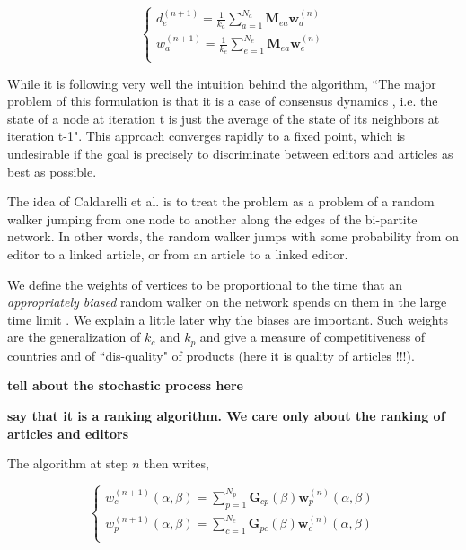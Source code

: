 \begin{equation}
\begin{cases}
 d_{e}^{(n+1)} = \frac{1}{k_a} \sum_{a=1}^{N_{a}} \mathbf{M}_{ea} \mathbf{w}_{a}^{(n)}\\
 w_{a}^{(n+1)} = \frac{1}{k_e}\sum_{e=1}^{N_{e}} \mathbf{M}_{ea} \mathbf{w}_{e}^{(n)}\\
\end{cases}
\end{equation}

While it is following very well the intuition behind the algorithm, ``The major problem of this formulation is that it is a case of consensus dynamics \cite{shamma2007cooperative}, i.e. the state of a node at iteration t is just the average of the state of its neighbors at iteration t-1". This approach converges rapidly to a fixed point, which is undesirable if the goal is precisely to discriminate between editors and articles as best as possible.

The idea of Caldarelli et al. \cite{caldarelli2012network} is to treat the problem as a problem of a random walker jumping from one node to another along the edges of the bi-partite network. In other words, the random walker jumps with some probability from on editor to a linked article, or from an article to a linked editor. 

We define the weights of vertices to be proportional to the time that an {\it appropriately biased} random walker on the network spends on them in the large time limit \cite{zlatic2010}. We explain a little later why the biases are important. Such weights are the generalization of $k_c$ and $k_p$ and give a measure of competitiveness of countries and of ``dis-quality" of products (here it is quality of articles !!!).


{\bf tell about the stochastic process here} \cite{caldarelli2012network}

{\bf say that it is a ranking algorithm. We care only about the ranking of articles and editors}

The algorithm at step $n$ then writes,

\begin{equation}
\begin{cases}
 w^{(n+1)}_c (\alpha,\beta) = \sum_{p=1}^{N_p}  \mathbf{G}_{cp}(\beta) \mathbf{w}^{(n)}_p (\alpha,\beta)\\
w^{(n+1)}_p (\alpha,\beta) = \sum_{c=1}^{N_c}  \mathbf{G}_{pc}(\beta) \mathbf{w}^{(n)}_c (\alpha,\beta)\\
\end{cases}
\end{equation}

